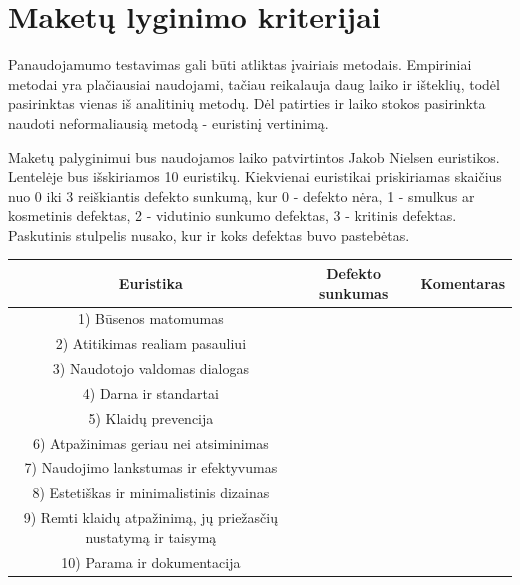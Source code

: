 \documentclass{VUMIFPSkursinis}
\begin{document}
\section{Maketų lyginimo kriterijai}
Panaudojamumo testavimas gali būti atliktas įvairiais metodais. Empiriniai metodai yra plačiausiai naudojami\cite{NielsenUsabilityEn}, tačiau reikalauja daug laiko ir išteklių, todėl pasirinktas vienas iš analitinių metodų. Dėl patirties ir laiko stokos pasirinkta naudoti neformaliausią metodą - euristinį vertinimą.

Maketų palyginimui bus naudojamos laiko patvirtintos Jakob Nielsen euristikos\cite{NielsenHeuristicsEn}. Lentelėje bus išskiriamos 10 euristikų. Kiekvienai euristikai priskiriamas skaičius nuo 0 iki 3 reiškiantis defekto sunkumą, kur 0 - defekto nėra, 1 - smulkus ar kosmetinis defektas, 2 - vidutinio sunkumo defektas, 3 - kritinis defektas. Paskutinis stulpelis nusako, kur ir koks defektas buvo pastebėtas.%
\begin{center}
\begin{tabular}{ |c|c|c| } 
 \hline
	Euristika & Defekto sunkumas & Komentaras \\ \hline
	1) Būsenos matomumas &  &  \\ \hline
	2) Atitikimas realiam pasauliui  &  &  \\ \hline
	3) Naudotojo valdomas dialogas &  &  \\ \hline
	4) Darna ir standartai &  &  \\ \hline
	5) Klaidų prevencija &  &  \\ \hline
	6) Atpažinimas geriau nei atsiminimas &  &  \\ \hline
	7) Naudojimo lankstumas ir efektyvumas &  &  \\ \hline
	8) Estetiškas ir minimalistinis dizainas &  &  \\ \hline
	9) Remti klaidų atpažinimą, jų priežasčių nustatymą ir taisymą &  &  \\ \hline
	10) Parama ir dokumentacija &  &  \\ \hline
\end{tabular}
\label{euristikųlentelė}
\end{center}
\end{document}
